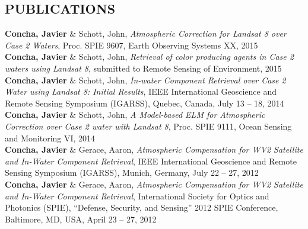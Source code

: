 \documentclass[11pt]{res} %
\begin{document}
\begin{resume}
\section{PUBLICATIONS}
\vspace{0.1in}
{\bf Concha, Javier} $\&$ Schott, John, {\it Atmospheric Correction for Landsat 8 over Case 2 Waters}, Proc. SPIE 9607, Earth Observing Systems XX, 2015
\vspace{0.1in}\\
{\bf Concha, Javier} $\&$ Schott, John, {\it Retrieval of color producing agents in Case 2 waters using Landsat 8}, submitted to Remote Sensing of Environment, 2015
\vspace{0.1in}\\
{\bf Concha, Javier} $\&$ Schott, John, {\it In-water Component Retrieval over Case 2 Water using Landsat 8: Initial Results}, IEEE International Geoscience and Remote Sensing Symposium (IGARSS), Quebec, Canada, July 13 -- 18, 2014
\vspace{0.1in}\\
{\bf Concha, Javier} $\&$ Schott, John, {\it A Model-based ELM for Atmospheric Correction over Case 2 water with Landsat 8}, Proc. SPIE 9111, Ocean Sensing and Monitoring VI, 2014
\vspace{0.1in}\\
{\bf Concha, Javier} $\&$ Gerace, Aaron, {\it Atmospheric Compensation for WV2 Satellite and In-Water Component Retrieval}, IEEE International Geoscience and Remote Sensing Symposium (IGARSS), Munich, Germany, July 22 -- 27, 2012
\vspace{0.1in}\\
{\bf Concha, Javier} $\&$ Gerace, Aaron, {\it Atmospheric Compensation for WV2 Satellite and In-Water Component Retrieval}, International Society for Optics and Photonics (SPIE), ``Defense, Security, and Sensing'' 2012 SPIE Conference, Baltimore, MD, USA, April 23 -- 27, 2012\\

\vspace{-0.1in}

\end{resume}
\end{document}
